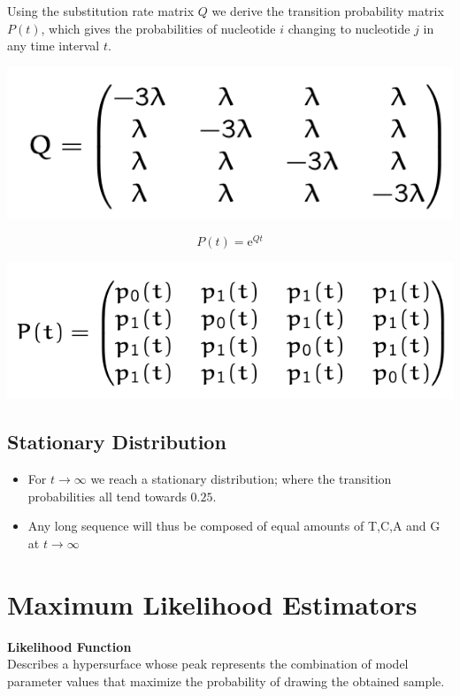 \documentclass{article}
\begin{document}
\begin{multicols*}{3}
Using the substitution rate matrix $Q$ we derive the transition probability matrix $P(t)$, which gives the probabilities of nucleotide $i$ changing to nucleotide $j$ in any time interval $t$.

\begin{center}
    \includegraphics[width=0.5\linewidth]{substitutionratematrix.png}
\end{center}

$$P(t) = \text{e}^{Qt}$$

\begin{center}
    \includegraphics[width=0.7\linewidth]{transitionprobabilitymatrix.png}
\end{center}

\subsection{Stationary Distribution}

\begin{itemize}
    \item For $t \rightarrow \infty$ we reach a stationary distribution; where the transition probabilities all tend towards $0.25$. 
    \item Any long sequence will thus be composed of equal amounts of T,C,A and G at $t \rightarrow \infty$
\end{itemize}

\section{Maximum Likelihood Estimators}
\begin{mdframed}[backgroundcolor=astral] 
    \textbf{Likelihood Function}\\
    Describes a hypersurface whose peak represents the combination of model parameter values that maximize the probability of drawing the obtained sample. 
\end{mdframed}


\end{multicols*}
\end{document}
